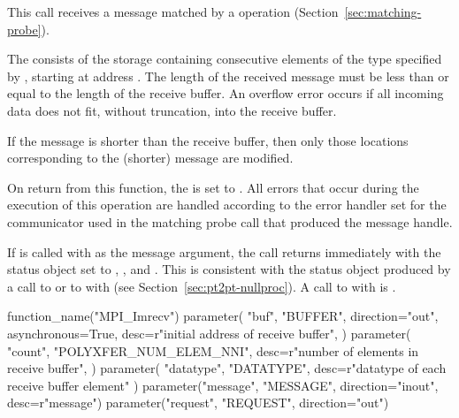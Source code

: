 This call receives a message matched by a  operation
(Section~\ref{sec:matching-probe}).

The  consists of the storage containing 
consecutive elements of the type specified by ,
starting at address .
The length of the received message
must be less than or equal to the length of the receive buffer. An
overflow error occurs if all incoming data does not fit, without
truncation, into the receive buffer.

If the message is shorter than the receive buffer, then only those
locations corresponding to the (shorter) message are modified.

On return from this function, the  is set to
. All errors that occur during the execution of
this operation are handled according to the error handler set for the
communicator used in the matching probe call that produced the message
handle.

If  is called with
as the
message argument, the call returns immediately with the status object
set to \mpicode{ = }, \mpicode{ = }, and
.
This is consistent with the status object produced by
a call to  or to 
with \mpicode{ = }
(see Section~\ref{sec:pt2pt-nullproc}).
A call to  with  is .


\begin{mpi-binding}
    function_name("MPI_Imrecv")
    parameter(
        "buf",
        "BUFFER",
        direction="out",
        asynchronous=True,
        desc=r"initial address of receive buffer",
    )
    parameter(
        "count",
        "POLYXFER_NUM_ELEM_NNI",
        desc=r"number of elements in receive buffer",
    )
    parameter(
        "datatype", "DATATYPE", desc=r"datatype of each receive buffer element"
    )
    parameter("message", "MESSAGE", direction="inout", desc=r"message")
    parameter("request", "REQUEST", direction="out")
\end{mpi-binding}


